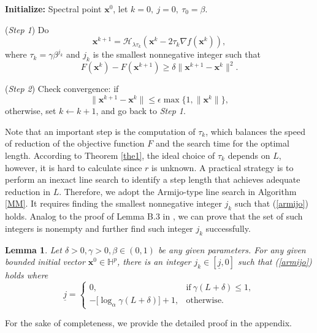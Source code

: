 \documentclass{article}
\newtheorem{lemma}[theorem]{Lemma}
\numberwithin{equation}{section}
\begin{document}
\begin{algorithm}[ht!]
	\caption{MM for solving (\ref{min-HPR})} \label{MM}
	
	
     \textbf{Initialize:} Spectral point $\mathbf{x}^0$, let $k=0,~j=0,~\tau_0=\beta$.

	
	
	
	{
	
			
			(\textit{Step 1}) Do
\begin{equation}\label{iter}\nonumber
\mathbf{x}^{k+1}=\mathcal{H}_{\lambda\tau_k}(\mathbf{x}^k-2\tau_k\nabla f(\mathbf{x}^k)),
\end{equation}
where $\tau_k=\gamma\beta^{j_k}$ and $j_k$ is the smallest nonnegative integer such that
\begin{equation}\label{armijo}
F(\mathbf{x}^{k})-F(\mathbf{x}^{k+1})\geq\delta\|\mathbf{x}^{k+1}-\mathbf{x}^k\|^2.
\end{equation}


			
			(\textit{Step 2}) Check convergence: if 
$$\|\mathbf{x}^{k+1}-\mathbf{x}^k\|\leq\epsilon \max\{1,\|\mathbf{x}^k\|\},$$
otherwise, set $k\leftarrow k+1$, and go back to \textit{Step 1}.
			

	}
	
	
\end{algorithm}



Note that an important step  is the computation of $\tau_k$, which balances the speed of reduction of the objective function $F$ and the search time for the optimal length. According to Theorem \ref{the1}, the ideal choice of $\tau_k$ depends on $L$, however, it is hard to calculate since $r$ is unknown. A practical strategy is to perform an inexact line search to identify a step length that achieves adequate reduction in $L$. 
Therefore, we adopt the Armijo-type line search in Algorithm \ref{MM}. 
It requires finding the smallest nonnegative integer $j_k$ such that (\ref{armijo}) holds. 
Analog to the proof of Lemma B.3 in \cite{fanss}, we can prove that the set of such integers is nonempty and further find such integer $j_k$ successfully.



\begin{lemma}\label{armi1}
Let $\delta>0, \gamma>0, \beta\in(0,1)$ be any given parameters. For any given bounded initial vector $\mathbf{x}^0\in\mathbb{H}^p$, there is an integer $j_k\in[\underline{j}, 0]$ such that (\ref{armijo}) holds
where $$\underline{j}=\left\{
             \begin{array}{lll}
             0, & \mbox{if}~\gamma(L+\delta)\leq 1,\\
             -\mbox{[}\log_\alpha\gamma(L+\delta)\mbox{]}+1, & \mbox{otherwise}.
             \end{array}
        \right.$$
\end{lemma}
For the sake of completeness, we provide the detailed proof in the appendix.
\end{document}
